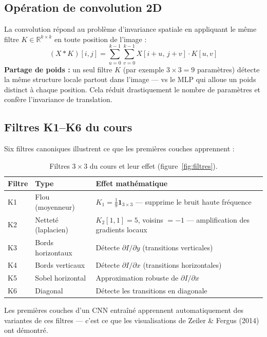 \documentclass[a4paper,11pt]{article}
\begin{document}
\subsection{Opération de convolution 2D}

La convolution répond au problème d'invariance spatiale en appliquant le même filtre
$K \in \mathbb{R}^{k \times k}$ en toute position de l'image :
\[
  (X * K)[i,j] = \sum_{u=0}^{k-1}\sum_{v=0}^{k-1} X[i+u,\, j+v]\cdot K[u,v]
\]
\textbf{Partage de poids :} un seul filtre $K$ (par exemple $3\times3 = 9$ paramètres)
détecte la même structure locale partout dans l'image — vs le MLP qui alloue un poids
distinct à chaque position. Cela réduit drastiquement le nombre de paramètres et confère
l'invariance de translation.

\subsection{Filtres K1–K6 du cours}

Six filtres canoniques illustrent ce que les premières couches apprennent :

\begin{table}[H]
\centering
\caption{Filtres $3\times3$ du cours et leur effet (figure~\ref{fig:filtres}).}
\begin{tabular}{llp{7cm}}
\toprule
\textbf{Filtre} & \textbf{Type} & \textbf{Effet mathématique} \\
\midrule
K1 & Flou (moyenneur)       & $K_1 = \frac{1}{9}\mathbf{1}_{3\times3}$ — supprime le bruit haute fréquence \\
K2 & Netteté (laplacien)    & $K_2[1,1]=5$, voisins $=-1$ — amplification des gradients locaux \\
K3 & Bords horizontaux      & Détecte $\partial I / \partial y$ (transitions verticales) \\
K4 & Bords verticaux        & Détecte $\partial I / \partial x$ (transitions horizontales) \\
K5 & Sobel horizontal       & Approximation robuste de $\partial I / \partial x$ \\
K6 & Diagonal               & Détecte les transitions en diagonale \\
\bottomrule
\end{tabular}
\end{table}

Les premières couches d'un CNN entraîné apprennent automatiquement des variantes
de ces filtres — c'est ce que les visualisations de Zeiler \& Fergus (2014) ont démontré.
\end{document}
